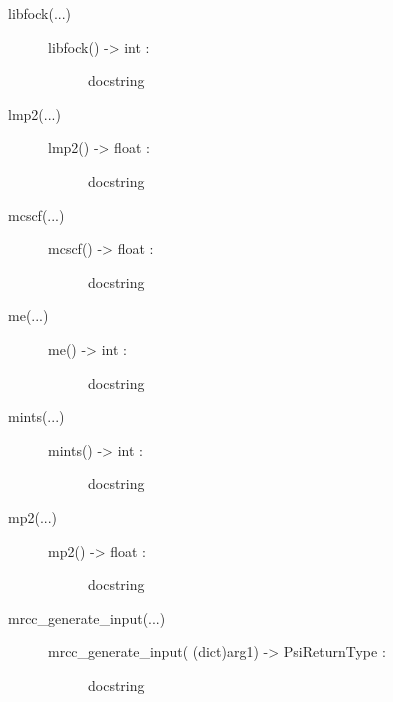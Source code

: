 \documentclass[letterpaper,10pt,english]{sphinxmanual}
\begin{document}
\begin{description}
\begin{description}
\begin{description}
\end{description}

\item[{libfock(...)}] \leavevmode\begin{description}
\item[{libfock() -\textgreater{} int :}] \leavevmode
docstring

\end{description}

\item[{lmp2(...)}] \leavevmode\begin{description}
\item[{lmp2() -\textgreater{} float :}] \leavevmode
docstring

\end{description}

\item[{mcscf(...)}] \leavevmode\begin{description}
\item[{mcscf() -\textgreater{} float :}] \leavevmode
docstring

\end{description}

\item[{me(...)}] \leavevmode\begin{description}
\item[{me() -\textgreater{} int :}] \leavevmode
docstring

\end{description}

\item[{mints(...)}] \leavevmode\begin{description}
\item[{mints() -\textgreater{} int :}] \leavevmode
docstring

\end{description}

\item[{mp2(...)}] \leavevmode\begin{description}
\item[{mp2() -\textgreater{} float :}] \leavevmode
docstring

\end{description}

\item[{mrcc\_generate\_input(...)}] \leavevmode\begin{description}
\item[{mrcc\_generate\_input( (dict)arg1) -\textgreater{} PsiReturnType :}] \leavevmode
docstring


\end{description}
\end{description}
\end{description}
\end{document}
